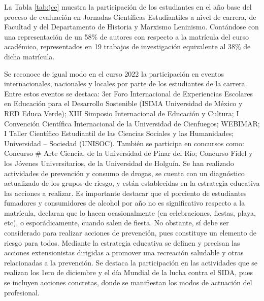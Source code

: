 La Tabla \ref{tab:jce} muestra la participación de los estudiantes en el año base del proceso de evaluación en Jornadas Científicas Estudiantiles a nivel de carrera, de Facultad y del Departamento de Historia y Marxismo Leninismo. Contándose con una representación de un 58\% de autores con respecto a la matrícula del curso académico, representados en 19 trabajos de investigación equivalente al 38\% de dicha matrícula.

Se reconoce de igual modo en el curso 2022 la participación en eventos internacionales, nacionales y locales por parte de los estudiantes de la carrera. Entre estos eventos se destaca: 3er Foro Internacional de Experiencias Escolares en Educación para el Desarrollo Sostenible (ISIMA Universidad de México y RED Educa Verde); XIII Simposio Internacional de Educación y Cultura; I Convención Científica Internacional de la Universidad de Cienfuegos; WEBIMAR; I Taller Científico Estudiantil de las Ciencias Sociales y las Humanidades; Universidad – Sociedad (UNISOC). También se participa en concursos como: Concurso \# Arte Ciencia, de la Universidad de Pinar del Río; Concurso Fidel y los Jóvenes Universitarios, de la Universidad de Holguín.
Se han realizado actividades de prevención y consumo de drogas, se cuenta con un diagnóstico actualizado de los grupos de riesgo, y están establecidas en la estrategia educativa las acciones a realizar. Es importante destacar que el porciento de estudiantes fumadores y consumidores de alcohol por año no es significativo respecto a la matrícula, declaran que lo hacen ocasionalmente (en celebraciones, fiestas, playa, etc), o esporádicamente, cuando salen de fiesta. No obstante, sí debe ser considerado para realizar acciones de prevención, pues constituye un elemento de riesgo para todos.
Mediante la estrategia educativa se definen y precisan las acciones extensionistas dirigidas a promover una recreación saludable y otras relacionadas a la prevención. Se destaca la participación en las actividades que se realizan los 1ero de diciembre y el día Mundial de la lucha contra el SIDA, pues se incluyen acciones concretas, donde se manifiestan los modos de actuación del profesional.